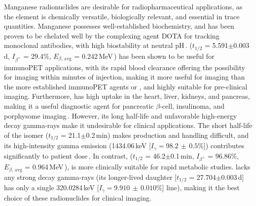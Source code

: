Manganese radionuclides are desirable for radiopharmaceutical applications, as 
the element is chemically versatile,  biologically relevant, and essential in trace quantities. 
Manganese possesses well-established biochemistry, and has been proven to be chelated well by the complexing agent DOTA for tracking monoclonal antibodies, with high biostability at neutral pH\,\cite{Graves2015}.
 ($t_{1/2}$ = 5.591$\pm$0.003\,d, $I_{\beta^+}$ = 29.4\%, $E_{\beta\text{, avg}}$ = 0.242\,MeV\,\cite{Dong2015}) has been shown to be useful for immunoPET applications, with its rapid blood clearance offering the possibility for imaging within minutes of injection,
making it more useful for imaging  than the more established immunoPET agents  or   , and highly suitable for pre-clinical imaging.  
Furthermore,   has high uptake in the heart, liver, kidneys, and pancreas, making it a useful diagnostic agent for pancreatic $\beta$-cell, insulinoma, and porphysome imaging\,\cite{Graves2015}. 
However, its  long half-life and unfavorable high-energy decay gamma-rays 
make it undesirable for clinical applications.
The short half-life of the   isomer ($t_{1/2}$ = 21.1$\pm$0.2\,min)
makes production and handling difficult, and its  high-intensity gamma emission (1434.06\,keV [$I_\gamma = 98.2\,\pm\,0.5\%$]) contributes significantly to patient dose\,\cite{Dong2015}.
In contrast,  ($t_{1/2}$ = 46.2$\pm$0.1\,min, $I_{\beta^+}$ = 96.86\%, $E_{\beta\text{, avg}}$ = 0.964\,MeV\,\cite{Wang2017}), 
is more clinically suitable for rapid metabolic studies.
 lacks any strong decay gamma-rays (its longer-lived daughter  [$t_{1/2}$ = 27.704$\pm$0.003\,d] has only a single  320.0284\,keV [$I_\gamma = 9.910\,\pm\,0.010\%$] line), making it the best choice of these radionuclides for clinical imaging.








